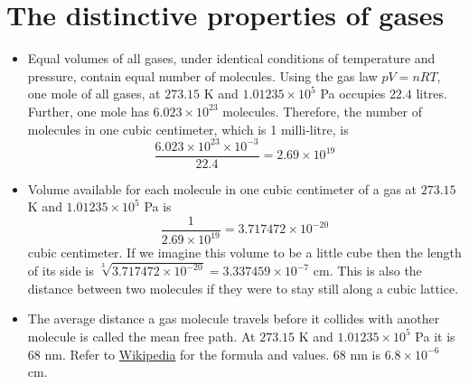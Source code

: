 \section{The distinctive properties of gases}\label{c1s7}
\begin{itemize}
\item Equal volumes of all gases, under identical conditions of temperature and pressure, contain equal number of molecules. Using the gas law $pV = nRT$, one mole of all gases, at 
$273.15$ K and $1.01235 \times 10^5$ Pa occupies $22.4$ litres. Further, one mole has $6.023 \times 10^{23}$ molecules. Therefore, the number of molecules in one cubic centimeter, 
which is 1 milli-litre, is
\[
\frac{6.023 \times 10^{23} \times 10^{-3}}{22.4} = 2.69 \times 10^{19}
\]

\item Volume available for each molecule in one cubic centimeter of a gas at $273.15$ K and $1.01235 \times 10^5$ Pa is 
\[
\frac{1}{2.69 \times 10^{19}} = 3.717472 \times 10^{-20}
\]
cubic centimeter. If we imagine this volume to be a little cube then the length of its side is $\sqrt[3]{3.717472 \times 10^{-20}} = 3.337459 \times 10^{-7}$ cm. This is also the distance
between two molecules if they were to stay still along a cubic lattice.

\item The average distance a gas molecule travels before it collides with another molecule is called the mean free path. At $273.15$ K and $1.01235 \times 10^5$ Pa it is $68$ nm. Refer
to \href{https://en.wikipedia.org/wiki/Mean_free_path}{Wikipedia} for the formula and values. $68$ nm is $6.8 \times 10^{-6}$ cm.


\end{itemize}
